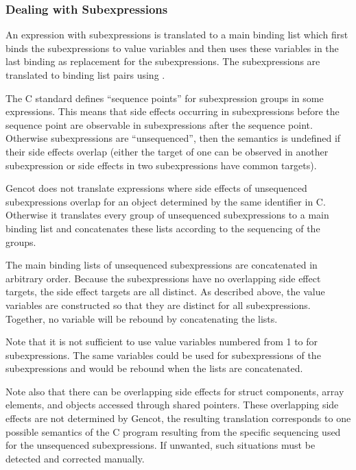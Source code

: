 \subsubsection{Dealing with Subexpressions}

An expression with subexpressions is translated to a main binding list which first binds the subexpressions to value
variables and then uses these variables in the last binding as replacement for the subexpressions. The subexpressions 
are translated to binding list pairs using .

The C standard defines ``sequence points'' for subexpression groups in some expressions. This means that side effects 
occurring in subexpressions before the sequence point are observable in subexpressions after the sequence point. Otherwise
subexpressions are ``unsequenced'', then the semantics is undefined if their side effects overlap (either the target of 
one can be observed in another subexpression or side effects in two subexpressions have common targets). 

Gencot does not translate expressions where side effects of unsequenced subexpressions overlap for an object determined 
by the same identifier in C. Otherwise it translates every group of unsequenced subexpressions to a main binding list 
and concatenates these lists according to the sequencing of the groups.

The main binding lists of unsequenced subexpressions are concatenated in arbitrary order. Because the subexpressions have no 
overlapping side effect targets, the side effect targets are all distinct. As described above, the value variables are 
constructed so that they are distinct for all subexpressions. Together, no variable will be rebound by concatenating the lists. 

Note that it is not sufficient to use value variables numbered from 1 to  for  subexpressions. The same variables
could be used for subexpressions of the subexpressions and would be rebound when the lists are concatenated.

Note also that there can be overlapping side effects for struct components, array elements, and objects accessed through
shared pointers. These overlapping side effects are not determined by Gencot, the resulting translation corresponds to
one possible semantics of the C program resulting from the specific sequencing used for the unsequenced subexpressions. 
If unwanted, such situations must be detected and corrected manually.

